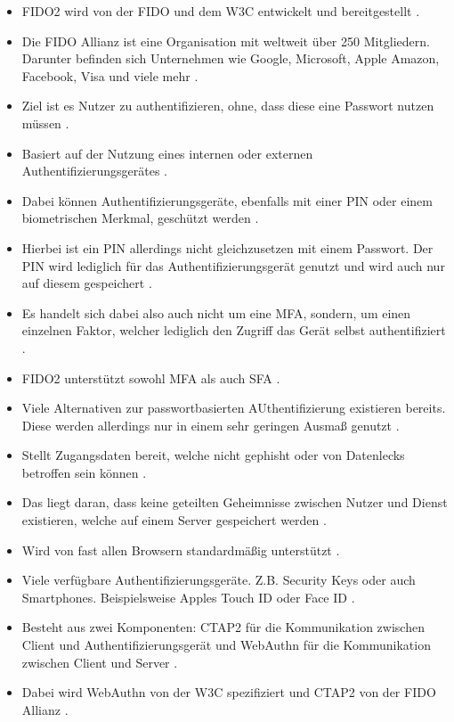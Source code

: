 \begin{itemize}
    \item FIDO2 wird von der \ac{FIDO} und dem \ac{W3C} entwickelt und bereitgestellt \cite{lyastani2020fido2} \cite{farke2020you}.
    \item Die \ac{FIDO} Allianz ist eine Organisation mit weltweit über 250 Mitgliedern. Darunter befinden sich Unternehmen wie Google, Microsoft, Apple Amazon, Facebook, Visa und viele mehr \cite{lyastani2020fido2} \cite{farke2020you}.
    \item Ziel ist es Nutzer zu authentifizieren, ohne, dass diese eine Passwort nutzen müssen \cite{morii2017research} \cite{barbosa2021provable}.
    \item Basiert auf der Nutzung eines internen oder externen Authentifizierungsgerätes \cite{morii2017research} \cite{barbosa2021provable}.
    \item Dabei können Authentifizierungsgeräte, ebenfalls mit einer PIN oder einem biometrischen Merkmal, geschützt werden \cite{farke2020you}.
    \item Hierbei ist ein PIN allerdings nicht gleichzusetzen mit einem Passwort. Der PIN wird lediglich für das Authentifizierungsgerät genutzt und wird auch nur auf diesem gespeichert \cite{farke2020you} \cite{barbosa2021provable}.
    \item Es handelt sich dabei also auch nicht um eine \ac{MFA}, sondern, um einen einzelnen Faktor, welcher lediglich den Zugriff das Gerät selbst authentifiziert \cite{barbosa2021provable}.
    \item FIDO2 unterstützt sowohl \ac{MFA} als auch \ac{SFA} \cite{lyastani2020fido2} \cite{farke2020you}.
    \item Viele Alternativen zur passwortbasierten AUthentifizierung existieren bereits. Diese werden allerdings nur in einem sehr geringen Ausmaß genutzt \cite{farke2020you}.
    \item Stellt Zugangsdaten bereit, welche nicht gephisht oder von Datenlecks betroffen sein können \cite{lyastani2020fido2}.
    \item Das liegt daran, dass keine geteilten Geheimnisse zwischen Nutzer und Dienst existieren, welche auf einem Server gespeichert werden \cite{morii2017research}.
    \item Wird von fast allen Browsern standardmäßig unterstützt \cite{lyastani2020fido2}.
    \item Viele verfügbare Authentifizierungsgeräte. Z.B. Security Keys oder auch Smartphones. Beispielsweise Apples Touch ID oder Face ID \cite{lyastani2020fido2}.
    \item Besteht aus zwei Komponenten: CTAP2 für die Kommunikation zwischen Client und Authentifizierungsgerät und WebAuthn für die Kommunikation zwischen Client und Server \cite{farke2020you}.
    \item Dabei wird WebAuthn von der \ac{W3C} spezifiziert und CTAP2 von der \ac{FIDO} Allianz \cite{farke2020you}.
\end{itemize}

